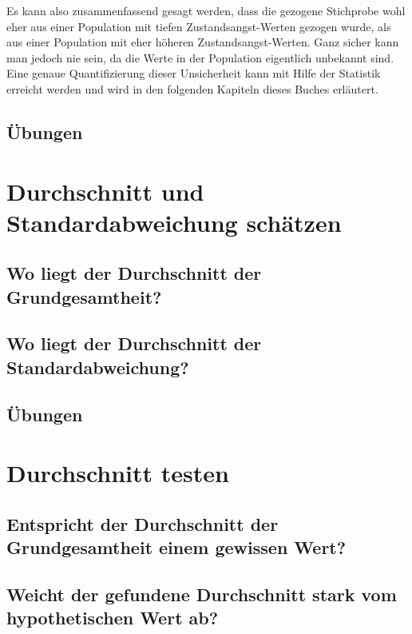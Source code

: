 \documentclass[
]{book}
\theoremstyle{definition}
\theoremstyle{definition}
\theoremstyle{definition}
\theoremstyle{definition}
\theoremstyle{remark}
\begin{document}
Es kann also zusammenfassend gesagt werden, dass die gezogene Stichprobe wohl eher aus einer Population mit tiefen Zustandsangst-Werten gezogen wurde, als aus einer Population mit eher höheren Zustandsangst-Werten. Ganz sicher kann man jedoch nie sein, da die Werte in der Population eigentlich unbekannt sind. Eine genaue Quantifizierung dieser Unsicherheit kann mit Hilfe der Statistik erreicht werden und wird in den folgenden Kapiteln dieses Buches erläutert.

\section{Übungen}\label{uxfcbungen}

\chapter{Durchschnitt und Standardabweichung schätzen}\label{durchschnitt-und-standardabweichung-schuxe4tzen}

\section{Wo liegt der Durchschnitt der Grundgesamtheit?}\label{wo-liegt-der-durchschnitt-der-grundgesamtheit}

\section{Wo liegt der Durchschnitt der Standardabweichung?}\label{wo-liegt-der-durchschnitt-der-standardabweichung}

\section{Übungen}\label{uxfcbungen-1}

\chapter{Durchschnitt testen}\label{durchschnitt-testen}

\section{Entspricht der Durchschnitt der Grundgesamtheit einem gewissen Wert?}\label{entspricht-der-durchschnitt-der-grundgesamtheit-einem-gewissen-wert}

\section{Weicht der gefundene Durchschnitt stark vom hypothetischen Wert ab?}\label{weicht-der-gefundene-durchschnitt-stark-vom-hypothetischen-wert-ab}
\end{document}

